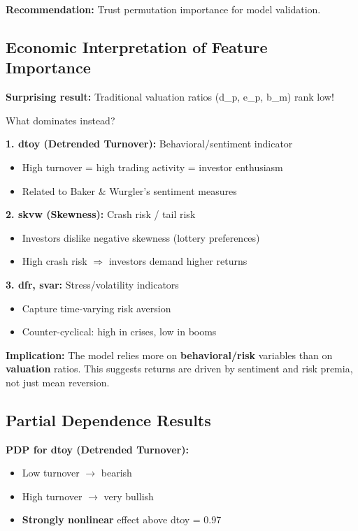 \documentclass[11pt,a4paper]{article}
\newcommand{\keyword}[1]{\textbf{\textcolor{AccentOrange}{#1}}}
\begin{document}
\textbf{Recommendation:} Trust permutation importance for model validation.

\subsection{Economic Interpretation of Feature Importance}

\textbf{Surprising result:} Traditional valuation ratios (d\_p, e\_p, b\_m) rank low!

What dominates instead?

\textbf{1. dtoy (Detrended Turnover):} Behavioral/sentiment indicator
\begin{itemize}
    \item High turnover = high trading activity = investor enthusiasm
    \item Related to Baker \& Wurgler's sentiment measures
\end{itemize}

\textbf{2. skvw (Skewness):} Crash risk / tail risk
\begin{itemize}
    \item Investors dislike negative skewness (lottery preferences)
    \item High crash risk $\Rightarrow$ investors demand higher returns
\end{itemize}

\textbf{3. dfr, svar:} Stress/volatility indicators
\begin{itemize}
    \item Capture time-varying risk aversion
    \item Counter-cyclical: high in crises, low in booms
\end{itemize}

\textbf{Implication:} The model relies more on \keyword{behavioral/risk} variables than on \keyword{valuation} ratios. This suggests returns are driven by sentiment and risk premia, not just mean reversion.

\subsection{Partial Dependence Results}

\textbf{PDP for dtoy (Detrended Turnover):}
\begin{itemize}
    \item Low turnover $\rightarrow$ bearish
    \item High turnover $\rightarrow$ very bullish
    \item \keyword{Strongly nonlinear} effect above dtoy = 0.97
\end{itemize}
\end{document}
